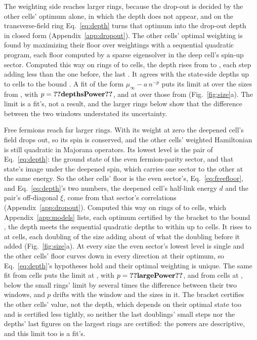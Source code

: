 \documentclass[aps,prd,reprint,superscriptaddress]{revtex4-2}
\begin{document}
The weighting side reaches larger rings, because the drop-out is decided by the other cells' optimum alone, in which the depth does not appear, and on the transverse-field ring Eq.~\eqref{eq:depth} turns that optimum into the drop-out depth in closed form (Appendix~\ref{app:dropout}). The other cells' optimal weighting is found by maximizing their floor over weightings with a sequential quadratic program, each floor computed by a sparse eigensolver in the deep cell's spin-up sector. Computed this way on rings of  to  cells, the depth rises from  to , each step adding less than the one before, the last . It agrees with the state-side depths up to  cells to the bound . A fit of the form $\mu_\infty - a\,n^{-p}$ puts its limit at  over the sizes from , with $p = \val{depthsPower}$, and at  over those from  (Fig.~\ref{fig:size}a). The limit is a fit's, not a result, and the larger rings below show that the difference between the two windows understated its uncertainty.

Free fermions reach far larger rings. With its weight at zero the deepened cell's field drops out, so its spin is conserved, and the other cells' weighted Hamiltonian is still quadratic in Majorana operators. Its lowest level is the pair of Eq.~\eqref{eq:depth}: the ground state of the even fermion-parity sector, and that state's image under the deepened spin, which carries one sector to the other at the same energy. So the other cells' floor is the even sector's, Eq.~\eqref{eq:freefloor}, and Eq.~\eqref{eq:depth}'s two numbers, the deepened cell's half-link energy $d$ and the pair's off-diagonal $\xi$, come from that sector's correlations (Appendix~\ref{app:dropout}). Computed this way on rings of  to  cells, which Appendix~\ref{app:models} lists, each optimum certified by the bracket to the bound , the depth meets the sequential quadratic depths to within  up to  cells. It rises to  at  cells, each doubling of the size adding about  of what the doubling before it added (Fig.~\ref{fig:size}a). At every size the even sector's lowest level is single and the other cells' floor curves down in every direction at their optimum, so Eq.~\eqref{eq:depth}'s hypotheses hold and their optimal weighting is unique. The same fit from  cells puts the limit at , with $p = \val{largePower}$, and from  cells at , below the small rings' limit by several times the difference between their two windows, and $p$ drifts with the window and the sizes in it. The bracket certifies the other cells' value, not the depth, which depends on their optimal state too and is certified less tightly, so neither the last doublings' small steps nor the depths' last figures on the largest rings are certified: the powers are descriptive, and this limit too is a fit's.
\end{document}
